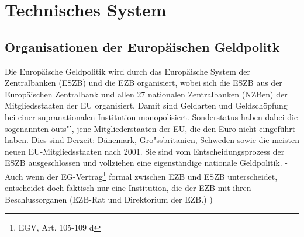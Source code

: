 \documentclass[
        onecolumn,
        a4paper,
        abstracton,
        parskip=half
        ,final
        ]{scrartcl}
\begin{document}
\section{Technisches System}
	\label{sec2:technischesSystem}



\subsection{Organisationen der Europ{\"a}ischen Geldpolitk}

Die Europ{\"a}ische Geldpolitik wird durch das Europ{\"a}ische System der Zentralbanken (ESZB) und die EZB organisiert, wobei sich die ESZB aus der Europ{\"a}ischen Zentralbank und allen 27 nationalen Zentralbanken (NZBen) der Mitgliedsstaaten der EU organisiert.  Damit sind Geldarten und Geldsch{\"o}pfung bei einer supranationalen Institution monopolisiert. Sonderstatus haben dabei die sogenannten \"outs"', jene Mitgliederstaaten der EU, die den Euro  nicht eingef{\"u}hrt haben. Dies sind Derzeit: D{\"a}nemark, Gro{"ss}britanien, Schweden sowie die meisten neuen EU-Mitgliedsstaaten nach 2001. Sie sind vom Entscheidungsprozess der ESZB ausgeschlossen und vollziehen eine eigenst{\"a}ndige nationale Geldpolitik.
-Auch wenn der EG-Vertrag\footnote[25]{EGV, Art. 105-109 d} formal zwischen EZB und ESZB unterscheidet, entscheidet doch faktisch nur eine Institution, die der EZB mit ihren Beschlussorganen (EZB-Rat und Direktorium der EZB.) \citep[vgl.][S.553]{Basseler2010})
\end{document}

